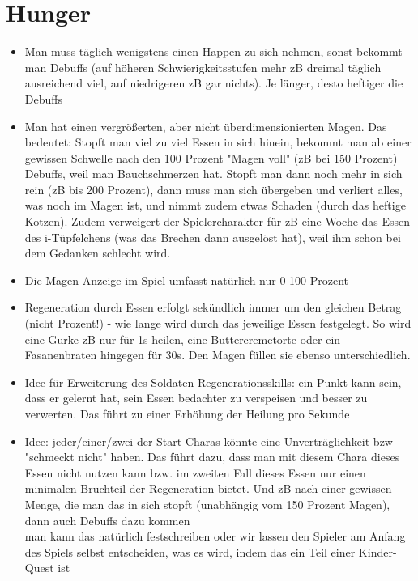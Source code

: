 \section{Hunger}
\begin{itemize}
	\item Man muss täglich wenigstens einen Happen zu sich nehmen, sonst bekommt man Debuffs (auf höheren Schwierigkeitsstufen mehr zB dreimal täglich ausreichend viel, auf niedrigeren zB gar nichts). Je länger, desto heftiger die Debuffs
	\item Man hat einen vergrößerten, aber nicht überdimensionierten Magen. Das bedeutet: Stopft man viel zu viel Essen in sich hinein, bekommt man ab einer gewissen Schwelle nach den 100 Prozent "Magen voll" (zB bei 150 Prozent) Debuffs, weil man Bauchschmerzen hat. Stopft man dann noch mehr in sich rein (zB bis 200 Prozent), dann muss man sich übergeben und verliert alles, was noch im Magen ist, und nimmt zudem etwas Schaden (durch das heftige Kotzen). Zudem verweigert der Spielercharakter für zB eine Woche das Essen des i-Tüpfelchens (was das Brechen dann ausgelöst hat), weil ihm schon bei dem Gedanken schlecht wird. 
	\item Die Magen-Anzeige im Spiel umfasst natürlich nur 0-100 Prozent
	\item Regeneration durch Essen erfolgt sekündlich immer um den gleichen Betrag (nicht Prozent!) - wie lange wird durch das jeweilige Essen festgelegt. So wird eine Gurke zB nur für 1s heilen, eine Buttercremetorte oder ein Fasanenbraten hingegen für 30s. Den Magen füllen sie ebenso unterschiedlich. 
	\item Idee für Erweiterung des Soldaten-Regenerationsskills: ein Punkt kann sein, dass er gelernt hat, sein Essen bedachter zu verspeisen und besser zu verwerten. Das führt zu einer Erhöhung der Heilung pro Sekunde
	\item Idee: jeder/einer/zwei der Start-Charas könnte eine Unverträglichkeit bzw "schmeckt nicht" haben. Das führt dazu, dass man mit diesem Chara dieses Essen nicht nutzen kann bzw. im zweiten Fall dieses Essen nur einen minimalen Bruchteil der Regeneration bietet. Und zB nach einer gewissen Menge, die man das in sich stopft (unabhängig vom 150 Prozent Magen), dann auch Debuffs dazu kommen\\
	man kann das natürlich festschreiben oder wir lassen den Spieler am Anfang des Spiels selbst entscheiden, was es wird, indem das ein Teil einer Kinder-Quest ist
\end{itemize}
